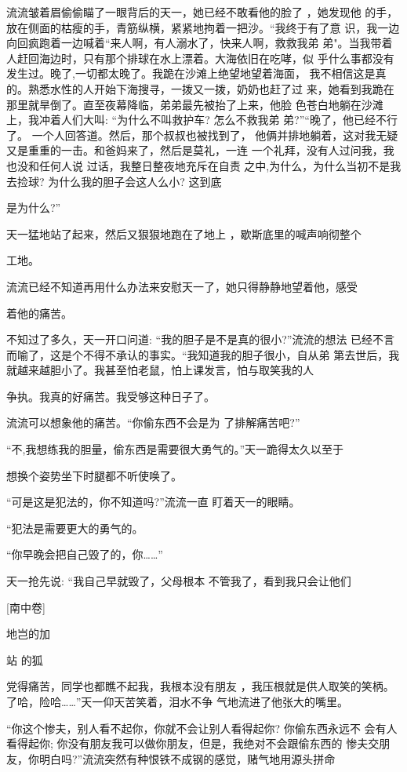 \documentclass{article}
\begin{document}
流流皱着眉偷偷瞄了一眼背后的天一，她已经不敢看他的脸了 ，她发现他
的手，放在侧面的枯瘦的手，青筋纵横，紧紧地拘着一把沙。“我终于有了意
识，我一边向回疯跑着一边喊着“来人啊，有人溺水了，快来人啊，救救我弟
弟"。当我带着人赶回海边时，只有那个排球在水上漂着。大海依旧在吃哮，似
乎什么事都没有发生过。晚了,一切都太晚了。我跪在沙滩上绝望地望着海面，
我不相信这是真的。熟悉水性的人开始下海搜寻，一拨又一拨，奶奶也赶了过
来，她看到我跪在那里就旱倒了。直至夜幕降临，弟弟最先被抬了上来，他脸
色苍白地躺在沙滩上，我冲着人们大叫: “为什么不叫救护车? 怎么不救我弟
弟?”“晚了，他已经不行了。 一个人回答道。然后，那个叔叔也被找到了，
他俩并排地躺着，这对我无疑又是重重的一击。和爸妈来了，然后是莫礼，一连
一个礼拜，没有人过问我，我也没和任何人说
\newpage
过话，我整日整夜地充斥在自责
之中,为什么，为什么当初不是我去捡球? 为什么我的胆子会这人么小? 这到底

是为什么?” 

天一猛地站了起来，然后又狠狠地跑在了地上 ，歇斯底里的喊声响彻整个

工地。 

流流已经不知道再用什么办法来安慰天一了，她只得静静地望着他，感受

着他的痛苦。 

不知过了多久，天一开口问道: “我的胆子是不是真的很小?”流流的想法
已经不言而喻了，这是个不得不承认的事实。“我知道我的胆子很小，自从弟
第去世后，我就越来越胆小了。我甚至怕老鼠，怕上课发言，怕与取笑我的人

争执。我真的好痛苦。我受够这种日子了。 

\newpage

流流可以想象他的痛苦。“你偷东西不会是为
了排解痛苦吧?” 

“不,我想练我的胆量，偷东西是需要很大勇气的。”天一跪得太久以至于

想换个姿势坐下时腿都不听使唤了。 

“可是这是犯法的，你不知道吗?”流流一直
盯着天一的眼睛。 


“犯法是需要更大的勇气的。 


“你早晚会把自己毁了的，你……” 

天一抢先说: “我自己早就毁了，父母根本
不管我了，看到我只会让他们 


[南中卷] 


地岂的加
\newpage


站          的狐 

党得痛苦，同学也都瞧不起我，我根本没有朋友 ，我压根就是供人取笑的笑柄。
了哈，险哈……”天一仰天苦笑着，泪水不争
气地流进了他张大的嘴里。 

“你这个惨夫，别人看不起你，你就不会让别人看得起你? 你偷东西永远不
会有人看得起你; 你没有朋友我可以做你朋友，但是，我绝对不会跟偷东西的
惨夫交朋友，你明白吗?”流流突然有种恨铁不成钢的感觉，赌气地用源头拼命
\end{document}
